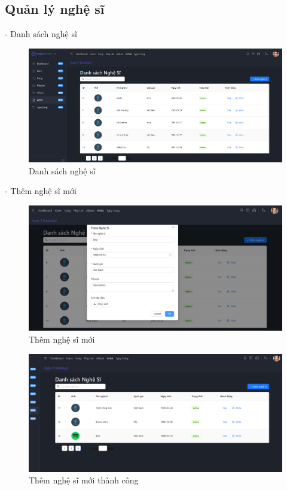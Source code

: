 \subsection{Quản lý nghệ sĩ}
- Danh sách nghệ sĩ
\begin{figure}[H]
    \centering
    \includegraphics[width=1\textwidth]{imgs/chap5/ql_nghe_si_1.png}
    \caption{Danh sách nghệ sĩ}
\end{figure}

- Thêm nghệ sĩ mới
\begin{figure}[H]
    \centering
    \includegraphics[width=1\textwidth]{imgs/chap5/ql_nghe_si_2.png}
    \caption{Thêm nghệ sĩ mới}
\end{figure}
\begin{figure}[H]
    \centering
    \includegraphics[width=1\textwidth]{imgs/chap5/ql_nghe_si_3.png}
    \caption{Thêm nghệ sĩ mới thành công}
\end{figure}

